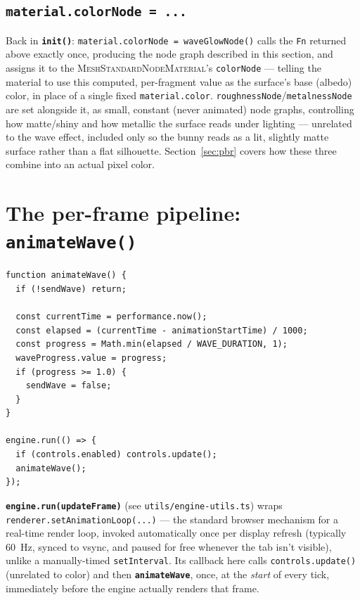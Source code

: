 \documentclass[11pt]{article}
\newcommand{\code}[1]{\texttt{#1}}
\newcommand{\func}[1]{\texttt{\textbf{#1}}}
\newcommand{\type}[1]{\textsc{#1}}
\begin{document}
\subsection*{\code{material.colorNode = ...}}
Back in \func{init()}: \code{material.colorNode = waveGlowNode()} calls the \code{Fn}
returned above exactly once, producing the node graph described in this section, and
assigns it to the \type{MeshStandardNodeMaterial}'s \code{colorNode} --- telling the
material to use this computed, per-fragment value as the surface's base (albedo) color, in
place of a single fixed \code{material.color}. \code{roughnessNode}/\code{metalnessNode}
are set alongside it, as small, constant (never animated) node graphs, controlling how
matte/shiny and how metallic the surface reads under lighting --- unrelated to the wave
effect, included only so the bunny reads as a lit, slightly matte surface rather than a flat
silhouette. Section~\ref{sec:pbr} covers how these three combine into an actual pixel color.

\section{The per-frame pipeline: \func{animateWave()}}
\label{sec:perframe}

\begin{lstlisting}
function animateWave() {
  if (!sendWave) return;

  const currentTime = performance.now();
  const elapsed = (currentTime - animationStartTime) / 1000;
  const progress = Math.min(elapsed / WAVE_DURATION, 1);
  waveProgress.value = progress;
  if (progress >= 1.0) {
    sendWave = false;
  }
}

engine.run(() => {
  if (controls.enabled) controls.update();
  animateWave();
});
\end{lstlisting}

\func{engine.run(updateFrame)} (see \code{utils/engine-utils.ts}) wraps
\code{renderer.setAnimationLoop(...)} --- the standard browser mechanism for a real-time
render loop, invoked automatically once per display refresh (typically 60~Hz, synced to
vsync, and paused for free whenever the tab isn't visible), unlike a manually-timed
\code{setInterval}. Its callback here calls \code{controls.update()} (unrelated to color)
and then \func{animateWave}, once, at the \emph{start} of every tick, immediately before
the engine actually renders that frame.
\end{document}
